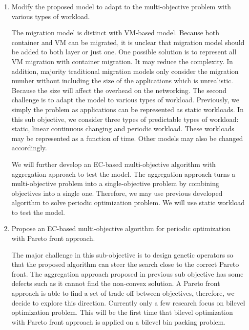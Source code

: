 \begin{enumerate}
	\item Modify the proposed model to adapt to the multi-objective problem with various types of workload. \\

	 The migration model is distinct with VM-based model. Because both container and VM can be migrated, it is unclear that migration model should be added to both layer or just one. One possible solution is to represent all VM migration with container migration. It may reduce the complexity. In addition, majority traditional migration models only consider the migration number without including the size of the applications which is unrealistic. Because the size will affect the overhead on the networking. 
	The second challenge is to adapt the model to various types of workload. Previously, we simply the problem as applications can be represented as static workloads. In this sub objective, we consider three types of predictable types of workload: static, linear continuous changing and periodic workload. These workloads may be represented as a function of time. Other models may also be changed accordingly.

	We will further develop an EC-based multi-objective algorithm with aggregation approach to test the model. The aggregation approach turns a multi-objective problem into a single-objective problem by combining objectives into a single one. Therefore, we may use previous developed algorithm to solve periodic optimization problem. We will use static workload to test the model. 

	\item Propose an EC-based multi-objective algorithm for periodic optimization with Pareto front approach.\\

	The major challenge in this sub-objective is to design genetic operators so that the proposed algorithm can steer the search close to the correct Pareto front. The aggregation approach proposed in previous sub objective has some defects such as it cannot find the non-convex solution. A Pareto front approach is able to find a set of trade-off between objectives, therefore, we decide to explore this direction. Currently only a few research \cite{Yin:2000bt, Deb:2009jh,Deb:2010in} focus on bilevel optimization problem. This will be the first time that bilevel optimization with Pareto front approach is applied on a bilevel bin packing problem.


\end{enumerate}
